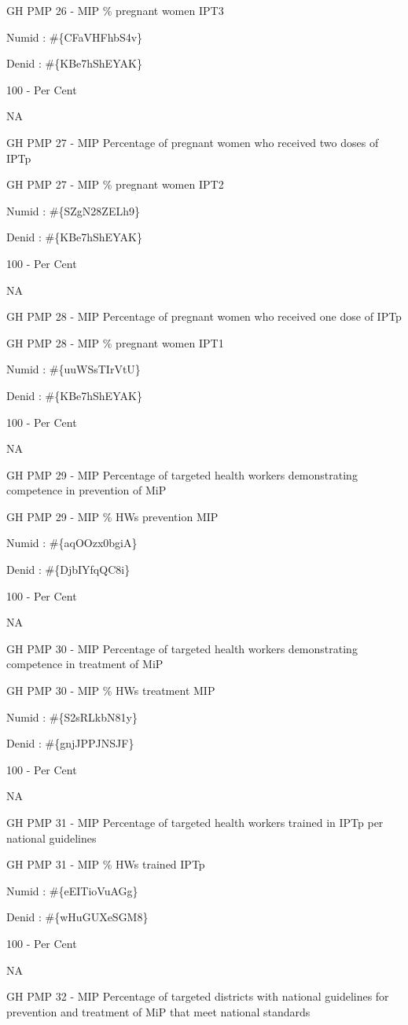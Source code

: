 \documentclass[]{book}
\begin{document}
GH PMP 26 - MIP \% pregnant women IPT3

Numid : \#\{CFaVHFhbS4v\}

Denid : \#\{KBe7hShEYAK\}

100 - Per Cent

NA

GH PMP 27 - MIP Percentage of pregnant women who received two doses of IPTp

GH PMP 27 - MIP \% pregnant women IPT2

Numid : \#\{SZgN28ZELh9\}

Denid : \#\{KBe7hShEYAK\}

100 - Per Cent

NA

GH PMP 28 - MIP Percentage of pregnant women who received one dose of IPTp

GH PMP 28 - MIP \% pregnant women IPT1

Numid : \#\{uuWSsTIrVtU\}

Denid : \#\{KBe7hShEYAK\}

100 - Per Cent

NA

GH PMP 29 - MIP Percentage of targeted health workers demonstrating competence in prevention of MiP

GH PMP 29 - MIP \% HWs prevention MIP

Numid : \#\{aqOOzx0bgiA\}

Denid : \#\{DjbIYfqQC8i\}

100 - Per Cent

NA

GH PMP 30 - MIP Percentage of targeted health workers demonstrating competence in treatment of MiP

GH PMP 30 - MIP \% HWs treatment MIP

Numid : \#\{S2sRLkbN81y\}

Denid : \#\{gnjJPPJNSJF\}

100 - Per Cent

NA

GH PMP 31 - MIP Percentage of targeted health workers trained in IPTp per national guidelines

GH PMP 31 - MIP \% HWs trained IPTp

Numid : \#\{eEITioVuAGg\}

Denid : \#\{wHuGUXeSGM8\}

100 - Per Cent

NA

GH PMP 32 - MIP Percentage of targeted districts with national guidelines for prevention and treatment of MiP that meet national standards
\end{document}
